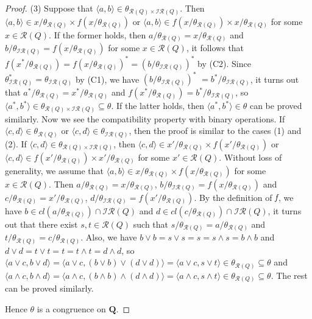 \documentclass[12pt]{amsart}
\theoremstyle{definition}
\theoremstyle{remark}
\numberwithin{equation}{section}
\begin{document}
\begin{proof}
(3) Suppose that $\langle a,b\rangle\in \theta_{\mathscr{R}(Q)\times \mathscr{IR}(Q)}$. Then $\langle a,b\rangle\in x/\theta_{\mathscr{R}(Q)}\times f(x/\theta_{\mathscr{R}(Q)})$ or
$\langle a,b\rangle\in f(x/\theta_{\mathscr{R}(Q)})\times x/\theta_{\mathscr{R}(Q)}$ for some $x\in \mathscr{R}(Q)$. If the former holds, then $a/\theta_{\mathscr{R}(Q)}=x/\theta_{\mathscr{R}(Q)}$ and $b/\theta_{\mathscr{IR}(Q)}=f(x/\theta_{\mathscr{R}(Q)})$ for some $x\in \mathscr{R}(Q)$,
it follows that $f(x^{\ast}/\theta_{\mathscr{R}(Q)})=f(x/\theta_{\mathscr{R}(Q)})^{\ast}=(b/\theta_{\mathscr{IR}(Q)})^{\ast}$ by (C2). Since $\theta_{\mathscr{IR}(Q)}^{\ast}=\theta_{\mathscr{IR}(Q)}$ by (C1), we have $(b/\theta_{\mathscr{IR}(Q)})^{\ast}$ $=b^{\ast}/\theta_{\mathscr{IR}(Q)}$,
it turns out that $a^{\ast}/\theta_{\mathscr{R}(Q)}=x^{\ast}/\theta_{\mathscr{R}(Q)}$ and $f(x^{\ast}/\theta_{\mathscr{R}(Q)})=b^{\ast}/\theta_{\mathscr{IR}(Q)}$, so $\langle a^{\ast},b^{\ast}\rangle\in \theta_{\mathscr{R}(Q)\times \mathscr{IR}(Q)}\subseteq \theta$. If the latter holds, then $\langle a^{\ast},b^{\ast}\rangle\in \theta$ can be proved similarly. Now we see the compatibility property with binary operations. If $\langle c,d\rangle\in \theta_{\mathscr{R}(Q)}$ or $\langle c,d\rangle\in \theta_{\mathscr{IR}(Q)}$, then the proof is similar to the cases (1) and (2).
If $\langle c,d\rangle\in \theta_{\mathscr{R}(Q)\times \mathscr{IR}(Q)}$, then $\langle c,d\rangle\in x'/\theta_{\mathscr{R}(Q)}\times f(x'/\theta_{\mathscr{R}(Q)})$ or
$\langle c,d\rangle\in f(x'/\theta_{\mathscr{R}(Q)})\times x'/\theta_{\mathscr{R}(Q)}$ for some $x'\in \mathscr{R}(Q)$. Without loss of generality, we assume that $\langle a,b\rangle\in x/\theta_{\mathscr{R}(Q)}\times f(x/\theta_{\mathscr{R}(Q)})$ for some  $x\in \mathscr{R}(Q)$. Then $a/\theta_{\mathscr{R}(Q)}=x/\theta_{\mathscr{R}(Q)}$, $b/\theta_{\mathscr{IR}(Q)}=f(x/\theta_{\mathscr{R}(Q)})$ and $c/\theta_{\mathscr{R}(Q)}=x'/\theta_{\mathscr{R}(Q)}$, $d/\theta_{\mathscr{IR}(Q)}=f(x'/\theta_{\mathscr{R}(Q)})$.
By the definition of $\emph{f}$, we have $b\in cl(a/\theta_{\mathscr{R}(Q)})\cap \mathscr{IR}(Q)$ and $d\in cl(c/\theta_{\mathscr{R}(Q)})\cap \mathscr{IR}(Q)$, it turns out that  there exist $s,t\in \mathscr{R}(Q)$ such that $s/\theta_{\mathscr{R}(Q)}= a/\theta_{\mathscr{R}(Q)}$ and $t/\theta_{\mathscr{R}(Q)}= c/\theta_{\mathscr{R}(Q)}$. Also, we have $b\vee b=s\vee s=s=s\wedge s=b\wedge b$  and $d\vee d=t\vee t=t=t\wedge t=d\wedge d$,
so $\langle a\vee c,b \vee d\rangle=\langle a\vee c,(b\vee b) \vee (d\vee d)\rangle=\langle a\vee c,s \vee t\rangle\in \theta_{\mathscr{R}(Q)}\subseteq \theta$ and $\langle a\wedge c,b \wedge d\rangle=\langle a\wedge c,(b\wedge b)\wedge (d\wedge d)\rangle=\langle a\wedge c,s \wedge t\rangle\in \theta_{\mathscr{R}(Q)}\subseteq \theta$. The rest can be proved similarly.

Hence $\theta$ is a congruence on $\mathbf{Q}$.
\end{proof}
\end{document}
